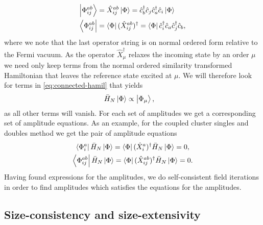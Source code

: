             \begin{align}
                \ket{\Phi^{ab}_{ij}}
                &= \hat{X}^{ab}_{ij}\ket{\Phi}
                = \hat{c}_{b}^{\dagger}\hat{c}_{j}\hat{c}_{a}^{\dagger}\hat{c}_{i}\ket{\Phi}
                \\
                \bra{\Phi^{ab}_{ij}}
                &= \bra{\Phi}(\hat{X}^{ab}_{ij})^{\dagger}
                = \bra{\Phi} \hat{c}_{i}^{\dagger}\hat{c}_{a}\hat{c}_{j}^{\dagger}\hat{c}_{b},
            \end{align}
            where we note that the last operator string is on normal ordered
            form relative to the Fermi vacuum.
            As the operator $\hat{X}^{\dagger}_{\mu}$ relaxes the incoming state
            by an order $\mu$ we need only keep terms from the normal ordered
            similarity transformed Hamiltonian that leaves the reference state
            excited at $\mu$.
            We will therefore look for terms in \autoref{eq:connected-hamil}
            that yields
            \begin{align}
                \bar{H}_N\ket{\Phi}
                &\propto \ket{\Phi_{\mu}},
            \end{align}
            as all other terms will vanish.
            For each set of amplitudes we get a corresponding set of amplitude
            equations.
            As an example, for the coupled cluster singles and doubles method we
            get the pair of amplitude equations
            \begin{gather}
                \bra{\Phi^{a}_{i}}
                \bar{H}_N\ket{\Phi}
                =
                \bra{\Phi}
                (\hat{X}^{a}_{i})^{\dagger}
                \bar{H}_N\ket{\Phi}
                = 0,
                \\
                \bra{\Phi^{ab}_{ij}}
                \bar{H}_N\ket{\Phi}
                =
                \bra{\Phi}
                (\hat{X}^{ab}_{ij})^{\dagger}
                \bar{H}_N\ket{\Phi}
                = 0.
            \end{gather}
            Having found expressions for the amplitudes, we do self-consistent
            field iterations in order to find amplitudes which satisfies the
            equations for the amplitudes.


        \subsection{Size-consistency and size-extensivity}

